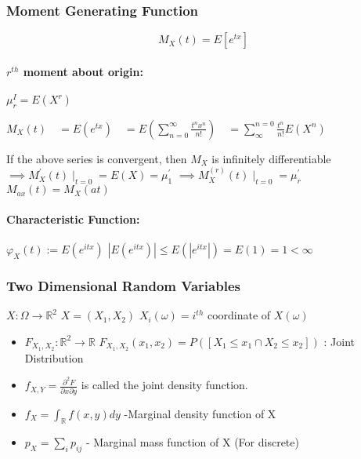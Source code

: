\documentclass[12pt]{article}
\begin{document}
{}

\subsubsection{Moment Generating Function}
\[ M_X(t) = E[e^{tx}]\]

\paragraph{$r^{th} $ moment about origin:}
$ \mu_{r}^{I} = E(X^r)$
\newline \newline

$M_X(t)  \displaystyle{\quad = E(e^{tx}) 
\quad = E\left(\sum_{n=0}^{\infty} \frac{t^n x^n}{n!} \right)
\quad = \sum_{\infty}^{n=0} \frac{t^n}{n!} E(X^n) }$
\newline \newline

If the above series is convergent, then $M_X$ is infinitely differentiable \newline
$ \implies M_X^{'}(t) \mid_{t=0} = E(X) = \mu_1^{'}$ \newline
$ \implies M_X^{(r)}(t) \mid_{t=0} = \mu_r^{'}$
\newline \newline
$M_{ax}(t) = M_X(at)$

\paragraph{Characteristic Function:}
$\varphi_X (t) := E(e^{itx})$ \newline
$ |E(e^{itx})| \leq E(|e^{itx}|) = E(1) =1 < \infty$

\subsubsection{Two Dimensional Random Variables}
$X: \Omega \rightarrow \mathbb{R}^2$
\newline
$X = (X_1, X_2 )$ \quad \quad $X_i(\omega) = i^{th}$ coordinate of $X(\omega)$ 
\newline

\begin{itemize}
    \item $F_{X_1, X_2} : \mathbb{R}^2 \rightarrow \mathbb{R}$ \newline
    $F_{X_1, X_2}(x_1, x_2) = P([X_1 \leq x_1 \cap X_2 \leq x_2])$ \quad : Joint Distribution

    \item $f_{X,Y} = \frac{ \partial ^2 F}{\partial x \partial y}$ is called the joint density function.

    \item $f_X = \int_{\mathbb{R}} f(x,y) dy$ \quad -Marginal density function of X

    \item $p_X = \sum_i p_{ij} $ \quad - Marginal mass function of X (For discrete)
\end{itemize}
\end{document}
